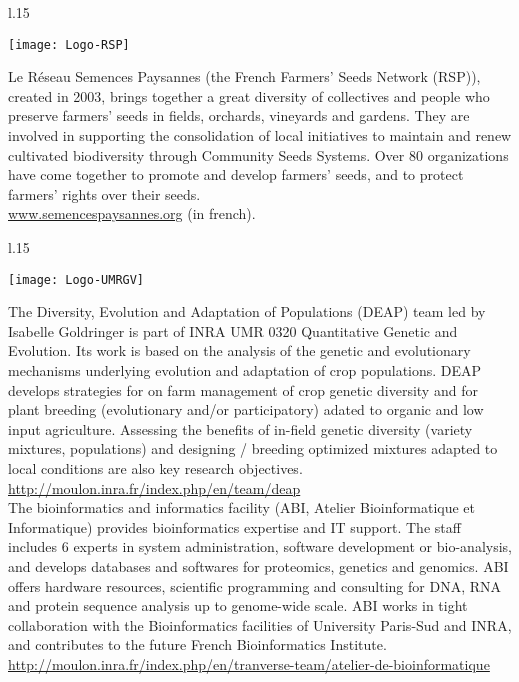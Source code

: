 \begin{wrapfigure}{l}{.15\textwidth}
\begin{center} \vspace{-20pt}
\texttt{[image: Logo-RSP]}
\end{center} \vspace{-20pt}
\end{wrapfigure}
\noindent
Le Réseau Semences Paysannes (the French Farmers' Seeds Network (RSP)), created in 2003, brings together a great diversity of collectives and people who preserve farmers' seeds in fields, orchards, vineyards and gardens. They are involved in supporting the consolidation of local initiatives to maintain and renew cultivated biodiversity through Community Seeds Systems. Over 80 organizations have come together to promote and develop farmers' seeds, and to protect farmers' rights over their seeds. \\
\url{www.semencespaysannes.org} (in french).


\vfill

\begin{wrapfigure}{l}{.15\textwidth}
\begin{center} \vspace{-20pt}
\texttt{[image: Logo-UMRGV]}
\end{center} \vspace{-20pt}
\end{wrapfigure}
\noindent
The Diversity, Evolution and Adaptation of Populations (DEAP) team led by Isabelle Goldringer is part of INRA UMR 0320 Quantitative Genetic and Evolution.
Its work is based on the analysis of the genetic and evolutionary mechanisms underlying evolution and adaptation of crop populations.
DEAP develops strategies for on farm management of crop genetic diversity and
for plant breeding (evolutionary and/or participatory) adated to organic and low input agriculture.
Assessing the benefits of in-field genetic diversity (variety mixtures, populations) and designing
/ breeding optimized mixtures adapted to local conditions are also key research objectives.\\
\url{http://moulon.inra.fr/index.php/en/team/deap} \\
\noindent
The bioinformatics and informatics facility (ABI, Atelier Bioinformatique et Informatique) provides bioinformatics expertise and IT support. The staff includes 6 experts in system administration, software development or bio-analysis, and develops databases and softwares for proteomics, genetics and genomics. ABI offers hardware resources, scientific programming and consulting for DNA, RNA and protein sequence analysis up to genome-wide scale. ABI works in tight collaboration with the Bioinformatics facilities of University Paris-Sud and INRA, and contributes to the future French Bioinformatics Institute. \\
\url{http://moulon.inra.fr/index.php/en/tranverse-team/atelier-de-bioinformatique} \\


